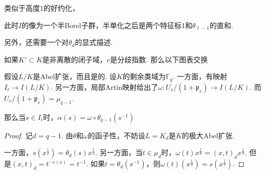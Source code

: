 类似于高度$1$的好约化，
\begin{cprop}
    此时$I$的像为一个半Borel子群，半单化之后是两个特征标$1$和$\theta_{\ell-1}$的直和.
\end{cprop}

另外，还需要一个对$\theta_d$的显式描述.

\begin{clem}
    如果$K'\subset K$是非离散的闭子域，$e$是分歧指数. 那么以下图表交换
    \begin{figure}[H]
        \centering
    \end{figure}
\end{clem}

\begin{cprop}
    假设$L/K$是Abel扩张，而且是\tame 的.
    设$K$的剩余类域为$\mathbb{F}_q$.
    一方面，有映射$I_t\to I(L/K)$.
    另一方面，局部Artin映射给出了$\omega: U_v/(1+\mathfrak{p}_v)\to I(L/K)$. 而$U_v/(1+\mathfrak{p}_v) = \mu_{q-1}$.

    那么当$s\in I_t$时，$\alpha(s) = \omega \circ \theta_{q-1}(s^{-1})$
    \label{surj::1.5.3}
\end{cprop}

\begin{proof}
    记$d=q-1$.
    由$\theta$和$\omega$的函子性，不妨设$L = K_d$是$K$的极大\tame Abel扩张.

    一方面，$s(x^{\frac{1}{d}}) = \theta_d(s)x^{\frac{1}{d}}$.
    另一方面，当$t\in \mu_{d}$时，$\omega(t)x^{\frac{1}{d}} = (x,t)_d x^{\frac{1}{d}}$.
    但是$(x,t)_d = t^{-v(x)}=t^{-1}$.
    如果$t=\theta_d(s^{-1})$，则$\omega(t)(x^{\frac{1}{d}}) = s(x^{\frac{1}{d}})$.
\end{proof}

